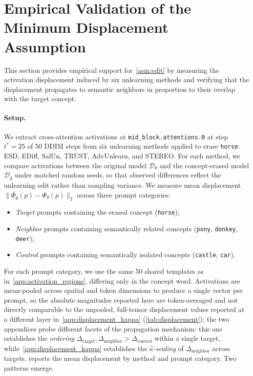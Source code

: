 \section{Empirical Validation of the Minimum Displacement Assumption}
\label{app:displacement}

This section provides empirical support for~\cref{asm:edit} by measuring the activation displacement induced by six unlearning methods and verifying that the displacement propagates to semantic neighbors in proportion to their overlap with the target concept.

\paragraph{Setup.}
We extract cross-attention activations at \texttt{mid\_block.attentions.0} at step $t^*{=}25$ of 50 DDIM steps from six unlearning methods applied to erase \texttt{horse}: ESD, EDiff, SalUn, TRUST, AdvUnlearn, and STEREO. For each method, we compare activations between the original model $\mathcal{D}_\theta$ and the concept-erased model $\mathcal{D}_{\hat\theta}$ under matched random seeds, so that observed differences reflect the unlearning edit rather than sampling variance. We measure mean displacement $\|\Phi_{\hat\theta}(p) - \Phi_\theta(p)\|_2$ across three prompt categories:
\begin{itemize}
    \item \emph{Target} prompts containing the erased concept (\texttt{horse});
    \item \emph{Neighbor} prompts containing semantically related concepts (\texttt{pony}, \texttt{donkey}, \texttt{deer});
    \item \emph{Control} prompts containing semantically isolated concepts (\texttt{castle}, \texttt{car}).
\end{itemize}
For each prompt category, we use the same 50 shared templates as in~\cref{app:activation_regions}, differing only in the concept word. Activations are mean-pooled across spatial and token dimensions to produce a single vector per prompt, so the absolute magnitudes reported here are token-averaged and not directly comparable to the unpooled, full-tensor displacement values reported at a different layer in~\cref{app:displacement_kappa} (\cref{tab:displacement}); the two appendices probe different facets of the propagation mechanism: this one establishes the \emph{ordering} $\Delta_{\mathrm{target}}, \Delta_{\mathrm{neighbor}} > \Delta_{\mathrm{control}}$ within a single target, while~\cref{app:displacement_kappa} establishes the \emph{$\hat\kappa$-scaling} of $\Delta_{\mathrm{neighbor}}$ across targets.  reports the mean displacement by method and prompt category. Two patterns emerge.

